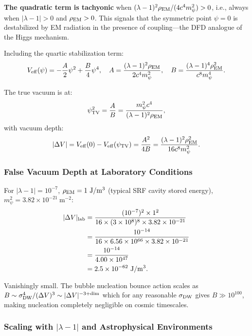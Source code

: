 \documentclass[aps,prd,twocolumn,superscriptaddress]{revtex4-2}
\newcommand{\lam}{|\lambda-1|}
\begin{document}
\textbf{The quadratic term is tachyonic} when $(\lambda-1)^2\rho_{\rm EM}/
(4c^4 m_\psi^2) > 0$, i.e., always when $\lam > 0$ and $\rho_{\rm EM} > 0$.
This signals that the symmetric point $\psi = 0$ is destabilized by
EM radiation in the presence of coupling---the DFD analogue of the Higgs
mechanism.

Including the quartic stabilization term:
\begin{equation}
V_{\rm eff}(\psi) = -\frac{A}{2}\psi^2 + \frac{B}{4}\psi^4,
\quad A = \frac{(\lambda-1)^2\rho_{\rm EM}}{2c^4 m_\psi^2},
\quad B = \frac{(\lambda-1)^4\rho_{\rm EM}^2}{c^8 m_\psi^4}.
\end{equation}

The true vacuum is at:
\begin{equation}
\psi_{\rm TV}^2 = \frac{A}{B} = \frac{m_\psi^2 c^4}{(\lambda-1)^2\rho_{\rm EM}},
\end{equation}
with vacuum depth:
\begin{equation}
|\Delta V| = V_{\rm eff}(0) - V_{\rm eff}(\psi_{\rm TV})
= \frac{A^2}{4B} = \frac{(\lambda-1)^2\rho_{\rm EM}^2}{16 c^8 m_\psi^2}.
\end{equation}

\subsubsection{False Vacuum Depth at Laboratory Conditions}

For $\lam = 10^{-7}$, $\rho_{\rm EM} = 1~\mathrm{J/m^3}$ (typical SRF
cavity stored energy), $m_\psi^2 = 3.82\times 10^{-21}~\mathrm{m^{-2}}$:
\begin{align}
|\Delta V|_{\rm lab} &= \frac{(10^{-7})^2\times 1^2}{16\times(3\times 10^8)^8\times 3.82\times 10^{-21}} \notag\\
&= \frac{10^{-14}}{16\times 6.56\times 10^{66}\times 3.82\times 10^{-21}} \notag\\
&= \frac{10^{-14}}{4.00\times 10^{47}} \notag\\
&= 2.5\times 10^{-62}~\mathrm{J/m^3}.
\end{align}

Vanishingly small.  The bubble nucleation bounce action scales as
$B \sim \sigma_{\rm DW}^4/(\Delta V)^3 \sim |\Delta V|^{-3+\rm{dim}}$
which for any reasonable $\sigma_{\rm DW}$ gives $B \gg 10^{100}$,
making nucleation completely negligible on cosmic timescales.

\subsubsection{Scaling with $|\lambda-1|$ and Astrophysical Environments}
\end{document}
